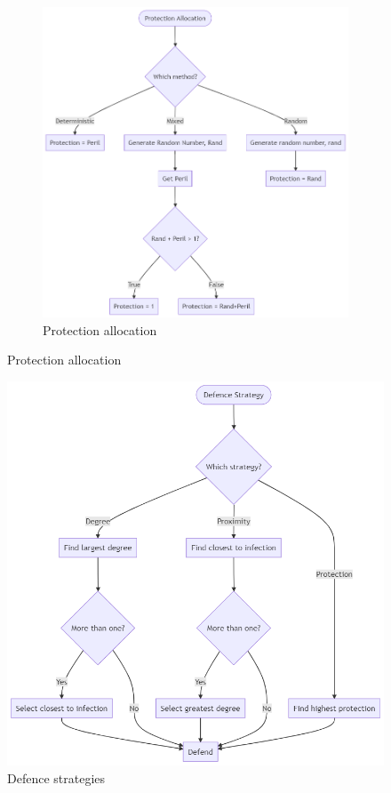 \documentclass[../report.tex]{subfiles}
\begin{document}
\begin{figure}[!ht]
\begin{centering}
\begin{subfigure}{0.6\linewidth}
    \includegraphics[width=0.9\linewidth]{assets/protection}
    \caption{Protection allocation}
    \label{fig:protection}
  \end{subfigure} 
\end{centering}
\end{figure}
\begin{figure}[!ht]
  \centering
  \includegraphics[scale=0.4]{assets/defence}
  \caption{Defence strategies}
  \label{fig:defence}
\end{figure}
\end{document}
